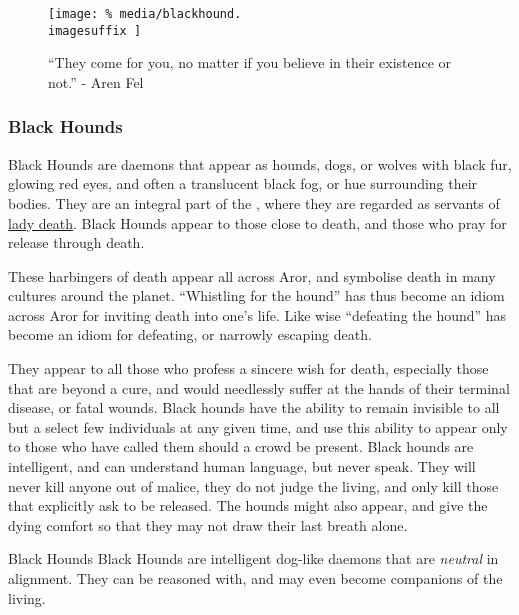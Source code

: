 \ifimages
\begin{figure*}[ht!]
  \centering
  \vspace{-5.8cm}
  \centerline{
    \texttt{[image: \%
      media/blackhound.\\imagesuffix
    ]}
  }
  \captionsetup{labelformat=empty}
  \caption{``They come for you, no matter if you believe in their existence or not.'' - Aren Fel}
\end{figure*}
\fi

\subsubsection{Black Hounds}
\label{sec:Black Hounds}

Black Hounds are daemons that appear as hounds, dogs, or wolves with black
fur, glowing red eyes, and often a translucent black fog, or hue surrounding
their bodies. They are an integral part of the , where
they are regarded as servants of \hyperref[sec:Morana]{lady death}. Black
Hounds appear to those close to death, and those who pray for release through
death.

These harbingers of death appear all across Aror, and symbolise death in many
cultures around the planet. ``Whistling for the hound'' has thus become an
idiom across Aror for inviting death into one's life. Like wise ``defeating
the hound'' has become an idiom for defeating, or narrowly escaping death.

They appear to all those who profess a sincere wish for death, especially
those that are beyond a cure, and would needlessly suffer at the hands of
their terminal disease, or fatal wounds. Black hounds have the ability to
remain invisible to all but a select few individuals at any given time, and
use this ability to appear only to those who have called them should a crowd
be present. Black hounds are intelligent, and can understand human language,
but never speak. They will never kill anyone out of malice, they do not judge
the living, and only kill those that explicitly ask to be released. The hounds
might also appear, and give the dying comfort so that they may not draw their
last breath alone.

\begin{35e}{Black Hounds}
  Black Hounds are intelligent dog-like daemons that are \emph{neutral} in
  alignment. They can be reasoned with, and may even become companions of
  the living.
\end{35e}

